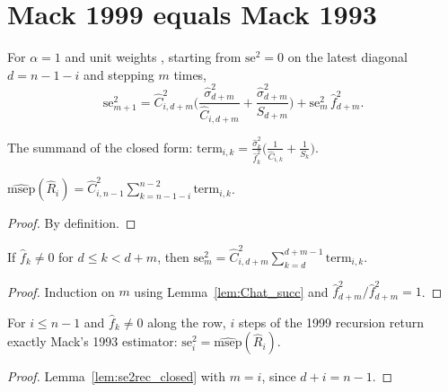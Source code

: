 \chapter{Mack 1999 equals Mack 1993}

\begin{definition}\label{def:se2rec}\leanok
{}
For $\alpha = 1$ and unit weights \cite{Mack1999}, starting from $\mathrm{se}^2 = 0$ on the
latest diagonal $d = n-1-i$ and stepping $m$ times,
\[
\mathrm{se}^2_{m+1} = \hat C_{i,d+m}^2\Big(\frac{\hat\sigma_{d+m}^2}{\hat C_{i,d+m}} + \frac{\hat\sigma_{d+m}^2}{S_{d+m}}\Big) + \mathrm{se}^2_m\,\hat f_{d+m}^2 .
\]
\end{definition}

\begin{definition}\label{def:mackTerm}\leanok
{}
The summand of the closed form:
$\mathrm{term}_{i,k} = \frac{\hat\sigma_k^2}{\hat f_k^2}\big(\frac{1}{\hat C_{i,k}} + \frac{1}{S_k}\big)$.
\end{definition}

\begin{lemma}\label{lem:msep_sum}\leanok
{}
$\widehat{\mathrm{msep}}(\hat R_i) = \hat C_{i,n-1}^2 \sum_{k=n-1-i}^{n-2} \mathrm{term}_{i,k}$.
\end{lemma}
\begin{proof}\leanok By definition. \end{proof}

\begin{lemma}\label{lem:se2rec_closed}\leanok
{}
If $\hat f_k \neq 0$ for $d \le k < d+m$, then
$\mathrm{se}^2_m = \hat C_{i,d+m}^2 \sum_{k=d}^{d+m-1} \mathrm{term}_{i,k}$.
\end{lemma}
\begin{proof}\leanok Induction on $m$ using Lemma~\ref{lem:Chat_succ} and $\hat f_{d+m}^2/\hat f_{d+m}^2 = 1$. \end{proof}

\begin{theorem}[Mack 1999 = Mack 1993]\label{thm:recursion}\leanok
{}
For $i \le n-1$ and $\hat f_k \neq 0$ along the row, $i$ steps of the 1999 recursion return
exactly Mack's 1993 estimator: $\mathrm{se}^2_i = \widehat{\mathrm{msep}}(\hat R_i)$.
\end{theorem}
\begin{proof}\leanok Lemma~\ref{lem:se2rec_closed} with $m = i$, since $d + i = n-1$. \end{proof}

